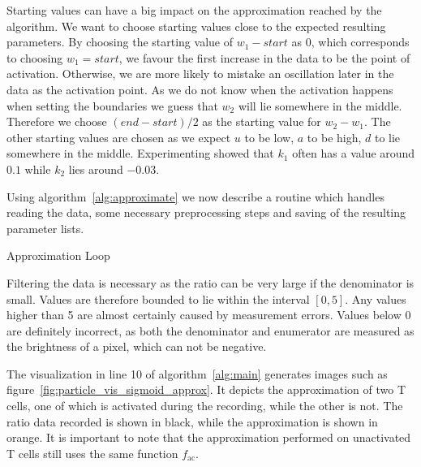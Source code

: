 Starting values can have a big impact on the approximation reached by the algorithm. We want to choose starting values close to the expected resulting parameters. By choosing the starting value of $w_1 - start$ as $0$, which corresponds to choosing $w_1 = start$, we favour the first increase in the data to be the point of activation. Otherwise, we are more likely to mistake an oscillation later in the data as the activation point. As we do not know when the activation happens when setting the boundaries we guess that $w_2$ will lie somewhere in the middle. Therefore we choose $(end - start)/2$ as the starting value for $w_2 - w_1$. The other starting values are chosen as we expect $u$ to be low, $a$ to be high, $d$ to lie somewhere in the middle. Experimenting showed that $k_1$ often has a value around $0.1$ while $k_2$ lies around $-0.03$.

Using algorithm~\ref{alg:approximate} we now describe a routine which handles reading the data, some necessary preprocessing steps and saving of the resulting parameter lists.

\begin{algorithm}[H] \label{alg:main}
	\SetAlgoLined
	\DontPrintSemicolon
	\LinesNumbered
	\caption{Approximation Loop}
	
	
	\BlankLine
\end{algorithm}
\vspace{1cm}

Filtering the data is necessary as the ratio can be very large if the denominator is small. Values are therefore bounded to lie within the interval $[0, 5]$. Any values higher than 5 are almost certainly caused by measurement errors. Values below 0 are definitely incorrect, as both the denominator and enumerator are measured as the brightness of a pixel, which can not be negative.

The visualization in line 10 of algorithm~\ref{alg:main} generates images such as figure~\ref{fig:particle_vis_sigmoid_approx}. It depicts the approximation of two T cells, one of which is activated during the recording, while the other is not. The ratio data recorded is shown in black, while the approximation is shown in orange. It is important to note that the approximation performed on unactivated T cells still uses the same function $f_{\text{ac}}$.


